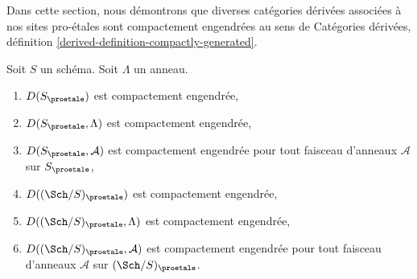 \noindent
Dans cette section, nous démontrons que diverses catégories dérivées associées
à nos sites pro-\'etales sont compactement engendrées au sens de
Catégories dérivées, définition \ref{derived-definition-compactly-generated}.

\begin{lemma}
\label{lemma-enough-compact-proetale}
Soit $S$ un schéma. Soit $\Lambda$ un anneau.
\begin{enumerate}
\item $D(S_\proetale)$ est compactement engendrée,
\item $D(S_\proetale, \Lambda)$ est compactement engendrée,
\item $D(S_\proetale, \mathcal{A})$ est compactement engendrée
pour tout faisceau d'anneaux $\mathcal{A}$ sur $S_\proetale$,
\item $D((\Sch/S)_\proetale)$ est compactement engendrée,
\item $D((\Sch/S)_\proetale, \Lambda)$ est compactement engendrée,
\item $D((\Sch/S)_\proetale, \mathcal{A})$ est compactement engendrée
pour tout faisceau d'anneaux $\mathcal{A}$ sur $(\Sch/S)_\proetale$.
\end{enumerate}
\end{lemma}

